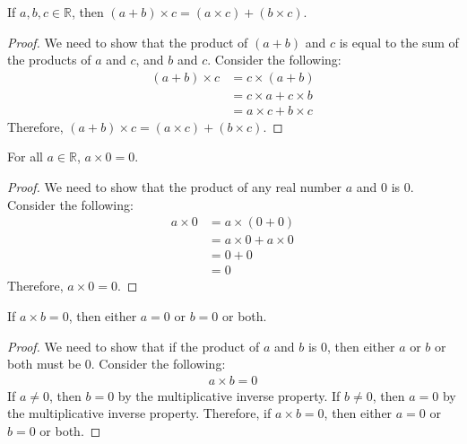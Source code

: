 \documentclass[11pt]{article}
\begin{document}
\begin{proposition}
    If $a, b, c \in \mathbb{R}$, then $(a + b) \times c = (a \times c) + (b \times c)$.
\end{proposition}

\begin{proof}
    We need to show that the product of $(a + b)$ and $c$ is equal to the sum of the products of $a$ and $c$, and $b$ and $c$. Consider the following:
    \begin{align*}
        (a + b) \times c & = c \times (a + b)        \\
                         & = c \times a + c \times b \\
                         & = a \times c + b \times c
    \end{align*}
    Therefore, $(a + b) \times c = (a \times c) + (b \times c)$.
\end{proof}

\begin{proposition}
    For all $a \in \mathbb{R}$, $a \times 0 = 0$.
\end{proposition}

\begin{proof}
    We need to show that the product of any real number $a$ and $0$ is $0$. Consider the following:
    \begin{align*}
        a \times 0 & = a \times (0 + 0)        \\
                   & = a \times 0 + a \times 0 \\
                   & = 0 + 0                   \\
                   & = 0
    \end{align*}
    Therefore, $a \times 0 = 0$.
\end{proof}

\begin{proposition}
    If $a \times b = 0$, then either $a = 0$ or $b = 0$ or both.
\end{proposition}

\begin{proof}
    We need to show that if the product of $a$ and $b$ is $0$, then either $a$ or $b$ or both must be $0$. Consider the following:
    \begin{align*}
        a \times b = 0
    \end{align*}
    If $a \neq 0$, then $b = 0$ by the multiplicative inverse property. If $b \neq 0$, then $a = 0$ by the multiplicative inverse property. Therefore, if $a \times b = 0$, then either $a = 0$ or $b = 0$ or both.
\end{proof}
\end{document}
